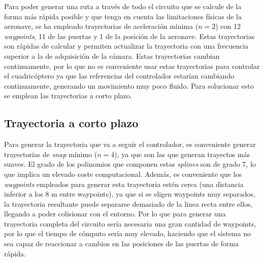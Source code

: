 Para poder generar una ruta a través de todo el circuito que se calcule de la forma más rápida posible y que tenga en cuenta las limitaciones físicas de la aeronave, se ha empleado trayectorias de aceleración mínima ($n = 2$) con 12 \textit{waypoints}, 11 de las puertas y 1 de la posición de la aeronave. Estas trayectorias son rápidas de calcular y permiten actualizar la trayectoria con una frecuencia superior a la de adquisición de la cámara. Estas trayectorias cambian continuamente, por lo que no es conveniente usar estas trayectorias para controlar el cuadricóptero ya que las referencias del controlador estarían cambiando continuamente, generando un movimiento muy poco fluido. Para solucionar esto se emplean las trayectorias a corto plazo.
\subsection{Trayectoria a corto plazo}

Para generar la trayectoria que va a seguir el controlador, es conveniente generar trayectorias de \textit{snap} mínimo ($n=4$), ya que son las que generan trayectos más suaves. El grado de los polinomios que componen estas \textit{splines} son de grado 7, lo que implica un elevado coste computacional. Además, es conveniente que los \textit{waypoints} empleados para generar esta trayectoria estén cerca (una distancia inferior a los 8 m entre waypoints), ya que si se eligen waypoints muy separados, la trayectoria resultante puede separarse demasiado de la linea recta entre ellos, llegando a poder colisionar con el entorno. Por lo que para generar una trayectoria completa del circuito sería necesaria una gran cantidad de waypoints, por lo que el tiempo de cómputo sería muy elevado, haciendo que el sistema no sea capaz de reaccionar a cambios en las posiciones de las puertas de forma rápida.

